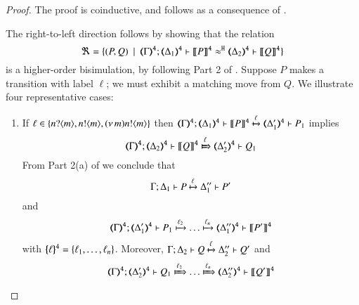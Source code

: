 \begin{proof}
	The proof is coinductive, and follows as a consequence of .

\bigskip
\noi The right-to-left direction follows by showing that the relation
%
	\[
		\Re = \set{
		(P, Q) 
		\setbar \horel{\tmap{\Gamma}{4}}{\tmap{\Delta_1}{4}}{\pmap{P}{4}}{\hwb}{\tmap{\Delta_2}{4}}{\pmap{Q}{4}}}
	\]
is a higher-order bisimulation, by following Part 2 of . 
	Suppose $P$ makes a transition with label $\ell$; we must exhibit a matching move from $Q$.
	We illustrate four representative cases:
	\begin{enumerate}
		\item	If $\ell \in \{n ? \langle m \rangle, n ! \langle m \rangle, (\nu\, m) n ! \langle m \rangle\}$ then
		$
		\horel{\tmap{\Gamma}{4}}{\tmap{\Delta_1}{4}}{\pmap{P}{4}}{\hby{\ell}}{\tmap{\Delta_1'}{4}}{P_1}
		$
		implies
		\[
		\horel{\tmap{\Gamma}{4}}{\tmap{\Delta_2}{4}}{\pmap{Q}{4}}{\Hby{\ell}}{\tmap{\Delta_2'}{4}}{Q_1}
		\]
		From Part 2(a) of  we conclude that
		\[
		\Gamma; \Delta_1 \vdash P \xmapsto{\ell} \Delta_1'' \vdash P'
		\]
		and
		\[
		\horel{\tmap{\Gamma}{4}}{\tmap{\Delta_1'}{4}}{P_1}{\hby{\ell_2} \dots \hby{\ell_n}}
		{\tmap{\Delta_1''}{4}}{\pmap{P'}{4}}
		\]
		with $\{\!\!\{\ell\}\!\!\}^{4} = \{\ell_1, \dots, \ell_n\}$.
				Moreover,
		$
			\Gamma; \Delta_2 \vdash Q \xmapsto{\ell} \Delta_2'' \vdash Q'
		$
		and
		\[
		\horel{\tmap{\Gamma}{4}}{\tmap{\Delta_2'}{4}}{Q_1}{\Hby{\ell_2} \dots \Hby{\ell_n}}
		{\tmap{\Delta_2''}{4}}{\pmap{Q'}{4}}
		\]
		

\end{enumerate}
\end{proof}
